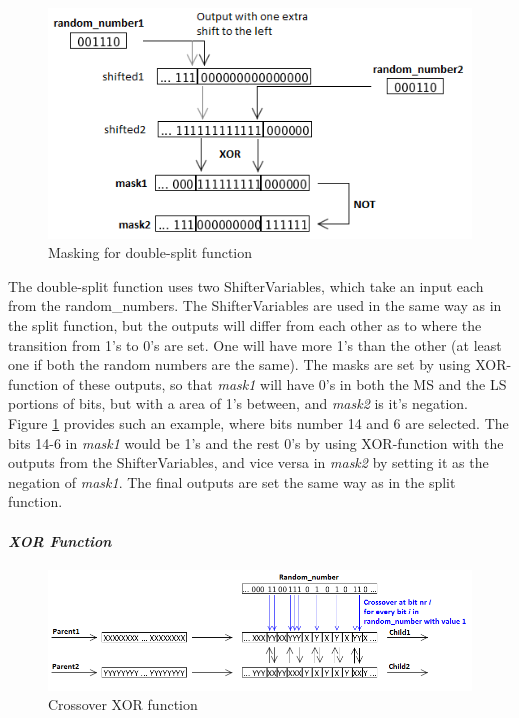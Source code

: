 \begin{figure}[H]
\includegraphics[width=\textwidth]{fpga/fig/crossover_doublesplit_mask2.png}
\caption{Masking for double-split function}
\label{fig_crossover_doublesplit_mask}
\end{figure}

The double-split function uses two ShifterVariables, which take an input each from the random\_numbers.
The ShifterVariables are used in the same way as in the split function, but the outputs will differ from each other as to where the transition from 1's to 0's are set.
One will have more 1's than the other (at least one if both the random numbers are the same).
The masks are set by using XOR-function of these outputs, so that \emph{mask1} will have 0's in both the MS and the LS portions of bits, but with a area of 1's between, and \emph{mask2} is it's negation.
Figure \ref{fig_crossover_doublesplit_mask} provides such an example, where bits number 14 and 6 are selected.
The bits 14-6 in \emph{mask1} would be 1's and the rest 0's by using XOR-function with the outputs from the ShifterVariables, and vice versa in \emph{mask2} by setting it as the negation of \emph{mask1}.
The final outputs are set the same way as in the split function.

\paragraph{\textit{XOR Function}}
\begin{figure}[H]
\includegraphics[width=\textwidth]{fpga/fig/crossover_xor.png}
\caption{Crossover XOR function}
\label{fig_crossover_xor}
\end{figure}

